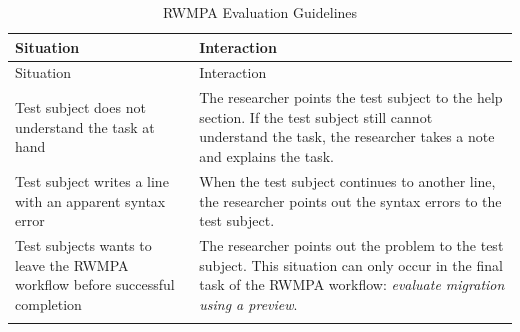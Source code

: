 \begin{appendix}
\hypertarget{tbl:rwmpa.guidelines}{}
\begin{longtable}[h]{@{}ll@{}}
\caption{RWMPA Evaluation Guidelines}\label{tbl:rwmpa.guidelines}\tabularnewline
\toprule
\begin{minipage}[b]{0.47\columnwidth}\raggedright
Situation\strut
\end{minipage} & \begin{minipage}[b]{0.47\columnwidth}\raggedright
Interaction\strut
\end{minipage}\tabularnewline
\midrule
\endfirsthead
\toprule
\begin{minipage}[b]{0.47\columnwidth}\raggedright
Situation\strut
\end{minipage} & \begin{minipage}[b]{0.47\columnwidth}\raggedright
Interaction\strut
\end{minipage}\tabularnewline
\midrule
\endhead
\begin{minipage}[t]{0.47\columnwidth}\raggedright
Test subject does not understand the task at hand\strut
\end{minipage} & \begin{minipage}[t]{0.47\columnwidth}\raggedright
The researcher points the test subject to the help section.
If the test subject still cannot understand the task, the researcher takes a note and explains the task.\strut
\end{minipage}\tabularnewline
\begin{minipage}[t]{0.47\columnwidth}\raggedright
Test subject writes a line with an apparent syntax error\strut
\end{minipage} & \begin{minipage}[t]{0.47\columnwidth}\raggedright
When the test subject continues to another line, the researcher points out the syntax errors to the test subject.\strut
\end{minipage}\tabularnewline
\begin{minipage}[t]{0.47\columnwidth}\raggedright
Test subjects wants to leave the RWMPA workflow before successful completion\strut
\end{minipage} & \begin{minipage}[t]{0.47\columnwidth}\raggedright
The researcher points out the problem to the test subject.
This situation can only occur in the final task of the RWMPA workflow: \emph{evaluate migration using a preview}.\strut
\end{minipage}\tabularnewline
\begin{minipage}[t]{0.47\columnwidth}\raggedright

\end{minipage}
\end{longtable}
\end{appendix}

